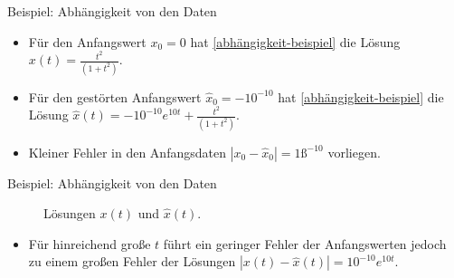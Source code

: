 \begin{frame}{Beispiel: Abhängigkeit von den Daten}
    \begin{itemize}
        \item<1-> Für den Anfangswert $x_0=0$ hat \eqref{abhängigkeit-beispiel} die Lösung
        $x(t)=\frac{t^2}{(1+t^2)}$.
        \item<1-> Für den gestörten Anfangswert $\hat{x}_0=-10^{-10}$ hat \eqref{abhängigkeit-beispiel} die Lösung
        $\hat{x}(t)=-10^{-10}e^{10t} + \frac{t^2}{(1+t^2)}$.
        \item<2-> Kleiner Fehler in den Anfangsdaten $|x_0 - \hat{x}_0| = 1ß^{-10}$ vorliegen.
    \end{itemize}
\end{frame}

\begin{frame}{Beispiel: Abhängigkeit von den Daten}
    \begin{figure}
        \begin{center}
            \caption{Lösungen $x(t)$ und $\hat{x}(t)$.}
            \label{sigmoid-figure}
        \end{center}
    \end{figure}
    \begin{itemize}
        \item<1-> Für hinreichend große $t$ führt ein geringer Fehler der Anfangswerten jedoch zu einem großen
        Fehler der Lösungen $|x(t) - \hat{x}(t)|=10^{-10}e^{10t}$.
    \end{itemize}
\end{frame}